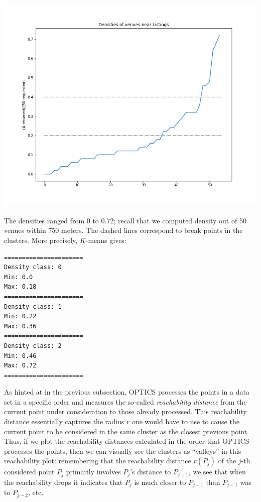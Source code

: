\documentclass{article}
\begin{document}
\begin{minipage}{0.6\textwidth}
\includegraphics[scale=0.45]{Densities_plot.png}
\end{minipage}
\begin{minipage}{0.35\textwidth}
The densities ranged from 0 to 0.72; recall that we computed density out of 50 venues within 750 meters. The dashed lines correspond to break points in the clusters. More precisely, $K$-means gives:
\begin{verbatim}
======================
Density class: 0
Min: 0.0
Max: 0.18
======================
Density class: 1
Min: 0.22
Max: 0.36
======================
Density class: 2
Min: 0.46
Max: 0.72
======================
\end{verbatim}
\end{minipage}

 As hinted at in the previous subsection, OPTICS processes the points in a data set in a specific order and measures the so-called {\em reachability distance} from the current point under consideration to those already processed. This reachability distance essentially captures the radius $r$ one would have to use to cause the current point to be considered in the same cluster as the closest previous point. Thus, if we plot the reachability distances calculated in the order that OPTICS processes the points, then we can visually see the clusters as ``valleys'' in this reachability plot: remembering that the reachability distance $r(P_j)$ of the $j$-th considered point $P_j$ primarily involves $P_j$'s distance to $P_{j-1}$, we see that when the reachability drops it indicates that $P_j$ is much closer to $P_{j-1}$ than $P_{j-1}$ was to $P_{j-2}$, etc. 
\end{document}
